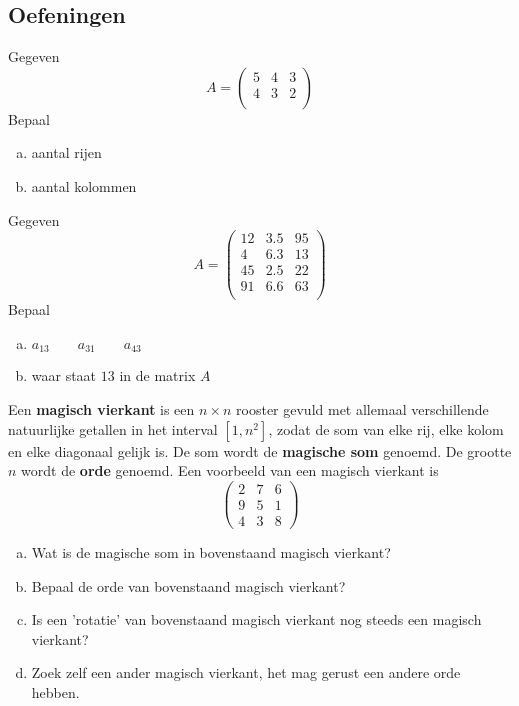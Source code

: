 \documentclass[12pt,twoside]{article}
\begin{document}
\subsection{Oefeningen}

\begin{oefening}
Gegeven
$$A=\begin{pmatrix}
5 & 4 & 3\\
4 & 3 & 2\\
\end{pmatrix}$$
Bepaal
\begin{enumerate}[(a)]
  \item aantal rijen
  \item aantal kolommen
\end{enumerate}
\end{oefening}

\begin{oefening}
Gegeven
$$A=\begin{pmatrix}
12 & 3.5 & 95\\
4  & 6.3 & 13\\
45 & 2.5 & 22\\
91 & 6.6 & 63\\
\end{pmatrix}$$
Bepaal
\begin{enumerate}[(a)]
  \item $a_{13} \qquad a_{31} \qquad a_{43}$
  \item waar staat $13$ in de matrix $A$
\end{enumerate}
\end{oefening}

\begin{oefening}
  Een {\bf magisch vierkant} is een $n \times n$ rooster gevuld met allemaal verschillende natuurlijke getallen in het interval $[1,n^2]$, zodat de som van elke rij, elke kolom en elke diagonaal gelijk is. De som wordt de {\bf magische som} genoemd. De grootte $n$ wordt de {\bf orde} genoemd. Een voorbeeld van een magisch vierkant is
  $$
  \begin{pmatrix}
    2 & 7 & 6\\
    9 & 5 & 1\\
    4 & 3 & 8
  \end{pmatrix}
  $$
  \begin{enumerate}[(a)]
  \item Wat is de magische som in bovenstaand magisch vierkant?
  \item Bepaal de orde van bovenstaand magisch vierkant?
  \item Is een 'rotatie' van bovenstaand magisch vierkant nog steeds een magisch vierkant?
  \item Zoek zelf een ander magisch vierkant, het mag gerust een andere orde hebben.
  \end{enumerate}
\end{oefening}
\end{document}
